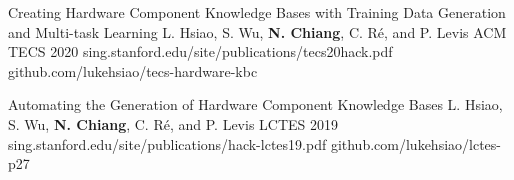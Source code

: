 



\begin{cvpubs}

  \cvpub
    {Creating Hardware Component Knowledge Bases with Training Data Generation and Multi-task Learning} %
    {L. Hsiao, S. Wu, \textbf{N. Chiang}, C. Ré, and P. Levis} %
    {ACM TECS} %
    {2020} %
    {sing.stanford.edu/site/publications/tecs20hack.pdf} %
    {github.com/lukehsiao/tecs-hardware-kbc} %

  \cvpub
    {Automating the Generation of Hardware Component Knowledge Bases} %
    {L. Hsiao, S. Wu, \textbf{N. Chiang}, C. Ré, and P. Levis} %
    {LCTES} %
    {2019} %
    {sing.stanford.edu/site/publications/hack-lctes19.pdf} %
    {github.com/lukehsiao/lctes-p27} %

\end{cvpubs}
